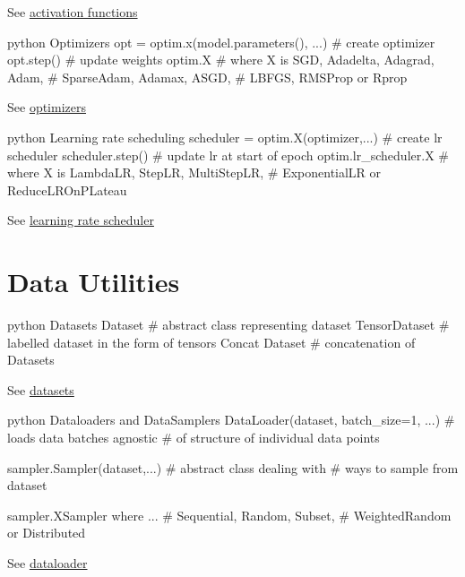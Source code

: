 \documentclass[10pt,a4paper]{article}
\begin{document}
\begin{multicols}{2}
See
\href{https://pytorch.org/docs/stable/nn.html\#non-linear-activations-weighted-sum-nonlinearity}{activation
functions}

\begin{codebox}{python}{\hypertarget{optimizers}{%
Optimizers\label{optimizers}}}
opt = optim.x(model.parameters(), ...)  # create optimizer
opt.step()                              # update weights
optim.X                                 # where X is SGD, Adadelta, Adagrad, Adam,
                                        # SparseAdam, Adamax, ASGD,
                                        # LBFGS, RMSProp or Rprop
\end{codebox}

See \href{https://pytorch.org/docs/stable/optim.html}{optimizers}

\begin{codebox}{python}{\hypertarget{learning-rate-scheduling}{%
Learning rate scheduling\label{learning-rate-scheduling}}}
scheduler = optim.X(optimizer,...)  # create lr scheduler
scheduler.step()                    # update lr at start of epoch
optim.lr_scheduler.X                # where X is LambdaLR, StepLR, MultiStepLR,
                                    # ExponentialLR or ReduceLROnPLateau
\end{codebox}

See
\href{https://pytorch.org/docs/stable/optim.html\#how-to-adjust-learning-rate}{learning
rate scheduler}

\hypertarget{data-utilities}{%
\section{Data Utilities}\label{data-utilities}}

\begin{codebox}{python}{\hypertarget{datasets}{%
Datasets\label{datasets}}}
Dataset                    # abstract class representing dataset
TensorDataset              # labelled dataset in the form of tensors
Concat Dataset             # concatenation of Datasets
\end{codebox}

See
\href{https://pytorch.org/docs/stable/data.html?highlight=dataset\#torch.utils.data.Dataset}{datasets}

\begin{codebox}{python}{\hypertarget{dataloaders-and-datasamplers}{%
Dataloaders and DataSamplers\label{dataloaders-and-datasamplers}}}
DataLoader(dataset, batch_size=1, ...)  # loads data batches agnostic
                                        # of structure of individual data points

sampler.Sampler(dataset,...)            # abstract class dealing with
                                        # ways to sample from dataset

sampler.XSampler where ...              # Sequential, Random, Subset,
                                        # WeightedRandom or Distributed
\end{codebox}

See
\href{https://pytorch.org/docs/stable/data.html?highlight=dataloader\#torch.utils.data.DataLoader}{dataloader}

\end{multicols}
\end{document}
